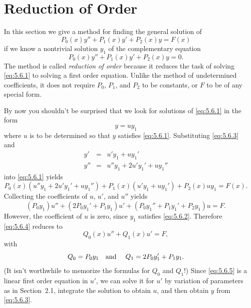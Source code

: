 \section{Reduction of Order}

\noindent
In this section we give a method for finding the general solution of
\begin{equation}
  \label{eq:5.6.1}P_{0}(x)y''+P_{1}(x)y'+P_{2}(x)y=F(x)
\end{equation}
if we know a nontrivial solution $y_{1}$ of the complementary equation
\begin{equation}
  \label{eq:5.6.2}P_{0}(x)y''+P_{1}(x)y'+P_{2}(x)y=0.
\end{equation}
The method is called {\color{blue}\it reduction of order\/} because it reduces the task of solving
\eqref{eq:5.6.1} to solving a first order equation. Unlike the method of undetermined coefficients,
it does not require $P_{0}$, $P_{1}$, and $P_{2}$ to be constants, or $F$ to be of any special form.

By now you shouldn't be surprised that we look for solutions of \eqref{eq:5.6.1} in the form
\begin{equation}
  \label{eq:5.6.3}y=uy_{1}
\end{equation}
where $u$ is to be determined so that $y$ satisfies \eqref{eq:5.6.1}. Substituting \eqref{eq:5.6.3}
and
\[
  \begin{array}{rcl}
    y'  & = & u'y_{1}+uy_{1}'             \\
    y'' & = & u''y_{1}+2u'y_{1}'+uy_{1}''
  \end{array}
\]
into \eqref{eq:5.6.1} yields
\[
  P_{0}(x)(u''y_{1}+2u'y_{1}'+uy_{1}'')+P_{1}(x)(u'y_{1}+uy_{1}')+P_{2}(x)uy_{1}=F(x).
\]
Collecting the coefficients of $u$, $u'$, and $u''$ yields
\begin{equation}
  \label{eq:5.6.4}(P_{0}y_{1})u''+(2P_{0}y_{1}'+P_{1}y_{1})u'+(P_{0}y_{1}''+P_{1}y_{1}'+P_{2}y_{1}) u=F.
\end{equation}
However, the coefficient of $u$ is zero, since $y_{1}$ satisfies \eqref{eq:5.6.2}. Therefore
\eqref{eq:5.6.4} reduces to
\begin{equation}
  \label{eq:5.6.5}Q_{0}(x)u''+Q_{1}(x)u'=F,
\end{equation}
with
\[
  Q_{0}=P_{0}y_{1}\mbox{\quad and \quad}Q_{1}=2P_{0}y_{1}'+P_{1}y_{1}.
\]
(It isn't worthwhile to memorize the formulas for $Q_{0}$ and $Q_{1}$!) Since \eqref{eq:5.6.5} is a
linear first order equation in $u'$, we can solve it for $u'$ by variation of parameters as in
Section~2.1, integrate the solution to obtain $u$, and then obtain $y$ from \eqref{eq:5.6.3}.

